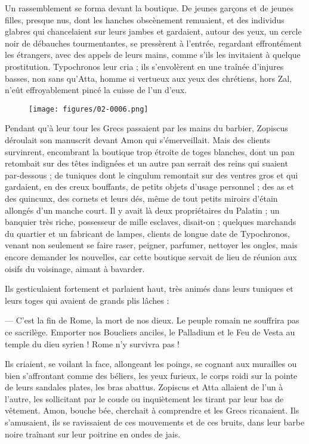 \documentclass[a4paper, 11pt, oneside, polutonikogreek, french]{article}
\begin{document}
Un rassemblement se forma devant la boutique. De jeunes garçons et de jeunes filles, presque nus, dont les hanches obscènement remuaient, et des individus glabres qui chancelaient sur leurs jambes et gardaient, autour des yeux, un cercle noir de débauches tourmentantes, se pressèrent à l'entrée, regardant effrontément les étrangers, avec des appels de leurs mains, comme s'ils les invitaient à quelque prostitution. Typochronos leur cria ; ils s'envolèrent en une traînée d'injures basses, non sans qu'Atta, homme si vertueux aux yeux des chrétiens, hors Zal, n'eût effroyablement pincé la cuisse de l'un d'eux.
\begin{figure}[H]
\centering
\texttt{[image: figures/02-0006.png]}
\end{figure}
Pendant qu'à leur tour les Grecs passaient par les mains du barbier, Zopiscus déroulait son manuscrit devant Amon qui s'émerveillait. Mais des clients survinrent, encombrant la boutique trop étroite de toges blanches, dont un pan retombait sur des têtes indignées et un autre pan serrait des reins qui suaient par-dessous ; de tuniques dont le cingulum remontait sur des ventres gros et qui gardaient, en des creux bouffants, de petits objets d'usage personnel ; des as et des quincunx, des cornets et leurs dés, même de tout petits miroirs d'étain allongés d'un manche court. Il y avait là deux propriétaires du Palatin ; un banquier très riche, possesseur de mille esclaves, disait-on ; quelques marchands du quartier et un fabricant de lampes, clients de longue date de Typochronos, venant non seulement se faire raser, peigner, parfumer, nettoyer les ongles, mais encore demander les nouvelles, car cette boutique servait de lieu de réunion aux oisifs du voisinage, aimant à bavarder.

Ils gesticulaient fortement et parlaient haut, très animés dans leurs tuniques et leurs toges qui avaient de grands plis lâches :

--- C'est la fin de Rome, la mort de nos dieux. Le peuple romain ne souffrira pas ce sacrilège. Emporter nos Boucliers anciles, le Palladium et le Feu de Vesta au temple du dieu syrien ! Rome n'y survivra pas !

Ils criaient, se voilant la face, allongeant les poings, se cognant aux murailles ou bien s'affrontant comme des béliers, les yeux furieux, le corps roidi sur la pointe de leurs sandales plates, les bras abattus. Zopiscus et Atta allaient de l'un à l'autre, les sollicitant par le coude ou inquiètement les tirant par leur bas de vêtement. Amon, bouche bée, cherchait à comprendre et les Grecs ricanaient. Ils s'amusaient, ils se ravissaient de ces mouvements et de ces bruits, dans leur barbe noire traînant sur leur poitrine en ondes de jais.
\end{document}
